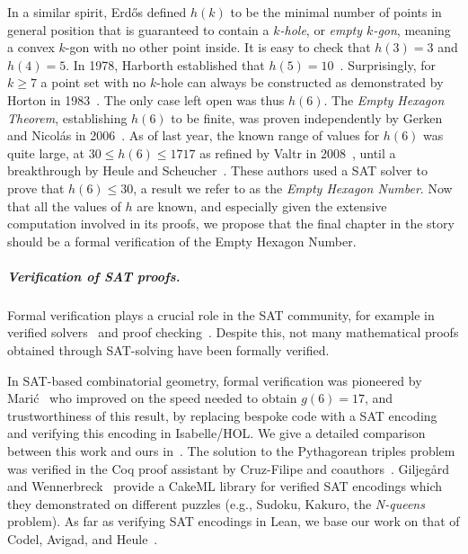 In a similar spirit,
Erd\H{o}s defined $h(k)$
to be the minimal number of points in general position
that is guaranteed to contain a \emph{$k$-hole},
or \emph{empty $k$-gon},
meaning a convex $k$-gon with no other point inside.
It is easy to check that $h(3) = 3$ and $h(4) = 5$.
In 1978, Harborth established that $h(5) = 10$~\cite{Harborth1978}.
Surprisingly, for $k \geq 7$ a point set with no $k$-hole
can always be constructed
as demonstrated by Horton in 1983~\cite{hortonSetsNoEmpty1983}.
The only case left open was thus $h(6)$.
The \emph{Empty Hexagon Theorem},
establishing $h(6)$ to be finite,
was proven independently by Gerken and Nicolás in 2006~\cite{gerkenEmptyConvexHexagons2008,nicolasEmptyHexagonTheorem2007}.
As of last year,
the known range of values for $h(6)$ was quite large,
at $30 \leq h(6) \leq 1717$
as refined by Valtr in 2008~\cite{valtr},
until a breakthrough by Heule and Scheucher~\cite{emptyHexagonNumber}.
These authors used a SAT solver
to prove that $h(6) \leq 30$,
a result we refer to as the \emph{Empty Hexagon Number}.
Now that all the values of $h$ are known,
and especially given the extensive computation involved in its proofs,
we propose that the final chapter in the story
should be a formal verification of the Empty Hexagon Number.

\subparagraph*{Verification of SAT proofs.}
Formal verification plays a crucial role in the SAT community,
for example in verified solvers~\cite{10maric_formal_verification_modern_sat_solver_shallow_embedding_isabelle_hol,oeVersatVerifiedModern2012,skotam_creusat_2022}
and proof checking~\cite{lammichEfficientVerifiedSAT2020,tanVerifiedPropagationRedundancy2023}.
Despite this,
not many mathematical proofs obtained through SAT-solving
have been formally verified.

In SAT-based combinatorial geometry,
formal verification was pioneered by Marić~\cite{19maric_fast_formal_proof_erdos_szekeres_conjecture_convex_polygons_most_six_points}
who improved on the speed needed to obtain $g(6) = 17$,
and trustworthiness of this result,
by replacing bespoke code with a SAT encoding
and verifying this encoding in \textsf{Isabelle/HOL}.
We give a detailed comparison between this work and ours in~.
The solution to the Pythagorean triples problem
was verified in the \textsf{Coq} proof assistant
by Cruz-Filipe and coauthors~\cite{formalPythagoreanTriples,LPAR-21:Formally_Proving_Boolean_Pythagorean}.
Giljeg\r{a}rd and Wennerbreck~\cite{GilAndWennerbeck} provide a \textsf{CakeML} library
for verified SAT encodings
which they demonstrated on different puzzles
(e.g., Sudoku, Kakuro, the \emph{N-queens} problem).
As far as verifying SAT encodings in Lean,
we base our work on that of Codel, Avigad, and Heule~\cite{Cayden}.

